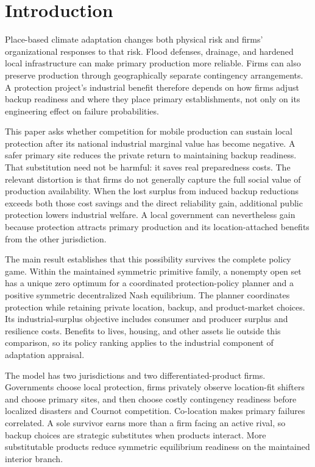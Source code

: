 \section{Introduction}\label{sec:introduction}

Place-based climate adaptation changes both physical risk and firms' organizational responses to that risk. Flood defenses, drainage, and hardened local infrastructure can make primary production more reliable. Firms can also preserve production through geographically separate contingency arrangements. A protection project's industrial benefit therefore depends on how firms adjust backup readiness and where they place primary establishments, not only on its engineering effect on failure probabilities.

This paper asks whether competition for mobile production can sustain local protection after its national industrial marginal value has become negative. A safer primary site reduces the private return to maintaining backup readiness. That substitution need not be harmful: it saves real preparedness costs. The relevant distortion is that firms do not generally capture the full social value of production availability. When the lost surplus from induced backup reductions exceeds both those cost savings and the direct reliability gain, additional public protection lowers industrial welfare. A local government can nevertheless gain because protection attracts primary production and its location-attached benefits from the other jurisdiction.

The main result establishes that this possibility survives the complete policy game. Within the maintained symmetric primitive family, a nonempty open set has a unique zero optimum for a coordinated protection-policy planner and a positive symmetric decentralized Nash equilibrium. The planner coordinates protection while retaining private location, backup, and product-market choices. Its industrial-surplus objective includes consumer and producer surplus and resilience costs. Benefits to lives, housing, and other assets lie outside this comparison, so its policy ranking applies to the industrial component of adaptation appraisal.

The model has two jurisdictions and two differentiated-product firms. Governments choose local protection, firms privately observe location-fit shifters and choose primary sites, and then choose costly contingency readiness before localized disasters and Cournot competition. Co-location makes primary failures correlated. A sole survivor earns more than a firm facing an active rival, so backup choices are strategic substitutes when products interact. More substitutable products reduce symmetric equilibrium readiness on the maintained interior branch.

